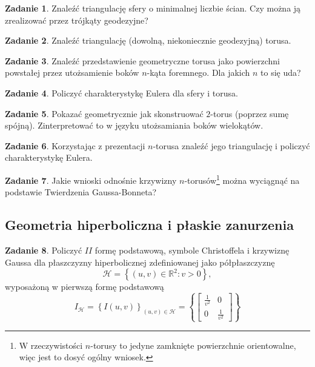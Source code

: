 \documentclass[a4paper,11pt]{article}
\theoremstyle{definition}\newtheorem{exercise}{Zadanie}
\theoremstyle{definition}\newtheorem{remark}{Uwaga}
\begin{document}
\begin{exercise}
Znaleźć triangulację sfery o minimalnej liczbie ścian. Czy można ją zrealizować 
przez tr\'ojkąty geodezyjne?
\end{exercise}

\begin{exercise}
Znaleźć triangulację (dowolną, niekoniecznie geodezyjną) torusa.
\end{exercise}

\begin{exercise}
Znaleźć przedstawienie geometryczne torusa jako powierzchni 
powstałej przez utożsamienie bok\'ow $n$\nobreakdash-kąta foremnego. Dla jakich 
$n$ to się uda?
\end{exercise}

\begin{exercise}
 Policzyć charakterystykę Eulera dla sfery i torusa.
\end{exercise}

\begin{exercise}
 Pokazać geometrycznie jak skonstruować $2$\nobreakdash-torus (poprzez sumę 
sp\'ojną). Zinterpretować to w języku utożsamiania bok\'ow wielokąt\'ow.
\end{exercise}

\begin{exercise}
Korzystając z prezentacji $n$\nobreakdash-torusa znaleźć jego triangulację i 
policzyć charakterystykę Eulera. 
\end{exercise}

\begin{exercise}
Jakie wnioski odnośnie krzywizny $n$\nobreakdash-torus\'ow\footnote{W 
rzeczywistości $n$\nobreakdash-torusy to jedyne zamknięte powierzchnie 
orientowalne, więc jest to dosyć og\'olny wniosek.} można wyciągnąć na 
podstawie Twierdzenia Gaussa-Bonneta?
\end{exercise}

\subsection{Geometria hiperboliczna i płaskie zanurzenia}

\begin{exercise}
 Policzyć $I\!I$ formę podstawową, symbole Christoffela i krzywiznę Gaussa dla 
płaszczyzny hiperbolicznej zdefiniowanej jako półpłaszczyznę 
\[\mathcal{H}=\left\{(u,v)\in \mathbb{R}^2\colon v>0 \right\},\] wyposażoną w 
pierwszą formę podstawową
\[I_{\mathcal{H}}=\left\{I(u,v)\right\}_{(u,v)\in 
\mathcal{H}}=\left\{\left[
\begin{array}{cc}
\frac{1}{v^2}&0\\
0 & \frac{1}{v^2}
\end{array}
\right]\right\}
\]

\end{exercise}
\end{document}
